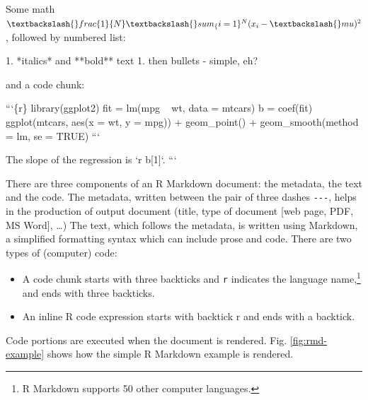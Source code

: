 \documentclass[conference,final,a4paper,]{IEEEtran}
\newenvironment{Shaded}{\begin{snugshade}}{\end{snugshade}}
\newcommand{\BaseNTok}[1]{\textcolor[rgb]{0.00,0.00,0.81}{#1}}
\newcommand{\FloatTok}[1]{\textcolor[rgb]{0.00,0.00,0.81}{#1}}
\newcommand{\NormalTok}[1]{#1}
\begin{document}
\begin{Shaded}
\begin{Highlighting}[]
\NormalTok{Some math }
\NormalTok{$\textbackslash{}frac\{1\}\{N\} \textbackslash{}sum_\{i=1\}^N (x_i -\textbackslash{}mu)^2$,}
\NormalTok{followed by numbered list:}
  
\NormalTok{1. }\FloatTok{*italics* and **bold** text}
\FloatTok{1. then bullets}
\FloatTok{    - simple, eh?}

\NormalTok{and a code chunk:}

\BaseNTok{```\{r\}}
\BaseNTok{library(ggplot2)}
\BaseNTok{fit = lm(mpg ~ wt, data = mtcars)}
\BaseNTok{b   = coef(fit)}
\BaseNTok{ggplot(mtcars, aes(x = wt, y = mpg)) +}
\BaseNTok{  geom_point() + }
\BaseNTok{  geom_smooth(method = lm, se = TRUE)}
\BaseNTok{```}

\NormalTok{The slope of the regression is }\BaseNTok{`r b[1]`}\NormalTok{.}
\BaseNTok{```}
\end{Highlighting}
\end{Shaded}

\normalsize

There are three components of an R Markdown document: the metadata, the text and the code.
The metadata, written between the pair of three dashes \texttt{-\/-\/-}, helps in the production of
output document (title, type of document {[}web page, PDF, MS Word{]}, \ldots)
The text, which follows the metadata, is written using Markdown, a simplified formatting syntax
which can include prose and code.
There are two types of (computer) code:

\begin{itemize}
\item
  A code chunk starts with three backticks and \texttt{r} indicates the
  language name,\footnote{R Markdown supports 50 other computer languages.} and ends with
  three backticks.
\item
  An inline R code expression starts with backtick r and ends with a backtick.
\end{itemize}

Code portions are executed when the document is rendered.
Fig. \ref{fig:rmd-example} shows how the simple R Markdown example is rendered.
\end{document}
